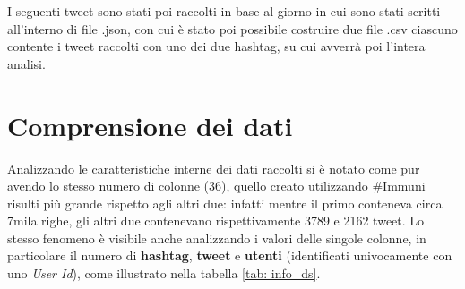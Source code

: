 I seguenti tweet sono stati poi raccolti in base al giorno in cui sono stati scritti all'interno di file .json, con cui è stato poi possibile costruire due file .csv ciascuno contente i tweet raccolti con uno dei due hashtag, su cui avverrà poi l'intera analisi. 


\section{Comprensione dei dati}
Analizzando le caratteristiche interne dei dati raccolti si è notato come pur avendo lo stesso numero di colonne (36), quello creato utilizzando \#Immuni risulti più grande rispetto agli altri due: infatti mentre il primo conteneva circa 7mila righe, gli altri due contenevano rispettivamente 3789 e 2162 tweet.
Lo stesso fenomeno è visibile anche analizzando i valori delle singole colonne, in particolare il numero di \textbf{hashtag}, \textbf{tweet} e \textbf{utenti} (identificati univocamente con uno \textit{User Id}), come illustrato nella tabella
\ref{tab: info_ds}.

